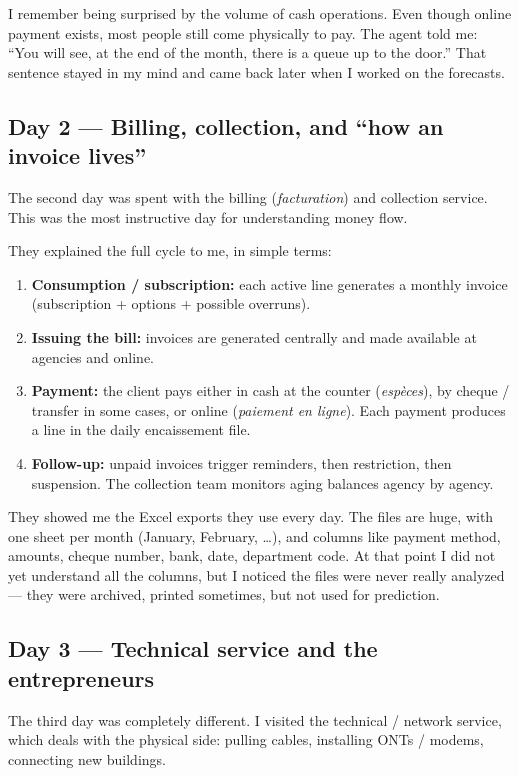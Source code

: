 \documentclass[12pt,a4paper]{report}
\begin{document}
I remember being surprised by the volume of cash operations. Even though online payment exists, most people still come physically to pay. The agent told me: ``You will see, at the end of the month, there is a queue up to the door.'' That sentence stayed in my mind and came back later when I worked on the forecasts.

\subsection{Day 2 --- Billing, collection, and ``how an invoice lives''}

The second day was spent with the billing (\textit{facturation}) and collection service. This was the most instructive day for understanding money flow.

They explained the full cycle to me, in simple terms:
\begin{enumerate}
\item \textbf{Consumption / subscription:} each active line generates a monthly invoice (subscription + options + possible overruns).
\item \textbf{Issuing the bill:} invoices are generated centrally and made available at agencies and online.
\item \textbf{Payment:} the client pays either in cash at the counter (\textit{espèces}), by cheque / transfer in some cases, or online (\textit{paiement en ligne}). Each payment produces a line in the daily encaissement file.
\item \textbf{Follow-up:} unpaid invoices trigger reminders, then restriction, then suspension. The collection team monitors aging balances agency by agency.
\end{enumerate}

They showed me the Excel exports they use every day. The files are huge, with one sheet per month (January, February, \dots), and columns like payment method, amounts, cheque number, bank, date, department code. At that point I did not yet understand all the columns, but I noticed the files were never really analyzed --- they were archived, printed sometimes, but not used for prediction.

\subsection{Day 3 --- Technical service and the entrepreneurs}

The third day was completely different. I visited the technical / network service, which deals with the physical side: pulling cables, installing ONTs / modems, connecting new buildings.
\end{document}
